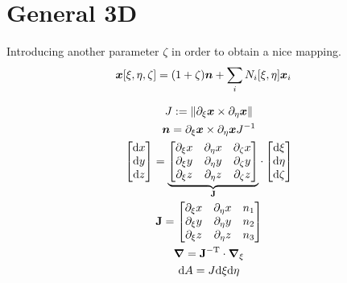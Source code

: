 \documentclass[a4paper,11pt]{article}
\newcommand{\ta}[1]{\text{\boldmath $#1$}} %
\newcommand{\ts}[1]{\text{\boldmath $\mathrm{#1}$}} %
\newcommand{\uv}[1]{\mathbb{#1}}
\newcommand{\um}[1]{\mathbb{#1}}
\newcommand{\dif}[1]{\mathrm{d}#1}
\newcommand{\diff}{\ta{\nabla}}
\newcommand{\pderiv}[2]{\partial_{#2} #1}
\newcommand{\norm}[1]{\left\lVert{#1}\right\rVert}
\newcommand{\T}{\mathrm{T}}
\newcommand{\defeq}{:=}
\begin{document}
\newpage
\section{General 3D}

Introducing another parameter $\zeta$ in order to obtain a nice mapping.
\begin{align}
 \ta x[\xi,\eta,\zeta] &= (1+\zeta)\ta n + \sum_i N_i[\xi,\eta]\ta x_i  %
\end{align}

\begin{gather}
 J \defeq \norm{\pderiv{\ta x}{\xi} \times  \pderiv{\ta x}{\eta}}\\
 \ta n = \pderiv{\ta x}{\xi} \times \pderiv{\ta x}{\eta} J^{-1}\\
 \begin{bmatrix}\dif x\\ \dif y\\ \dif z\end{bmatrix} =
  \underbrace{\begin{bmatrix}\pderiv{x}{\xi} & \pderiv{x}{\eta} & \pderiv{x}{\zeta}\\
	  \pderiv{y}{\xi} & \pderiv{y}{\eta} & \pderiv{y}{\zeta}\\
	  \pderiv{z}{\xi} & \pderiv{z}{\eta} & \pderiv{z}{\zeta} \end{bmatrix}}_{\ts J}
  \cdot \begin{bmatrix}\dif \xi \\ \dif \eta \\ \dif \zeta\end{bmatrix}\\
  \ts J = \begin{bmatrix}\pderiv{x}{\xi} & \pderiv{x}{\eta} & n_1\\
	  \pderiv{y}{\xi} & \pderiv{y}{\eta} & n_2\\
	  \pderiv{z}{\xi} & \pderiv{z}{\eta} & n_3 \end{bmatrix}\\
 \diff = \ts J^{-\T}\cdot\diff_\xi\\
 \dif A = J \dif \xi \dif \eta 
\end{gather}
\end{document}
